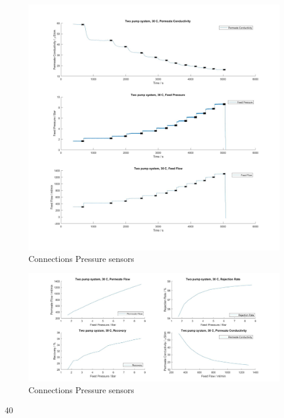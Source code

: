 \begin{figure}[H]
    \centering
    \includegraphics[width=1.1\textwidth]{FeedPumpIncrease30}
    \caption{Connections Pressure sensors}
    \label{fig:PressConn}
\end{figure}


\begin{figure}[H]
    \centering
    \includegraphics[width=1.1\textwidth]{FeedPumpIncrease30Key}
    \caption{Connections Pressure sensors}
    \label{fig:PressConn}
\end{figure}

40


